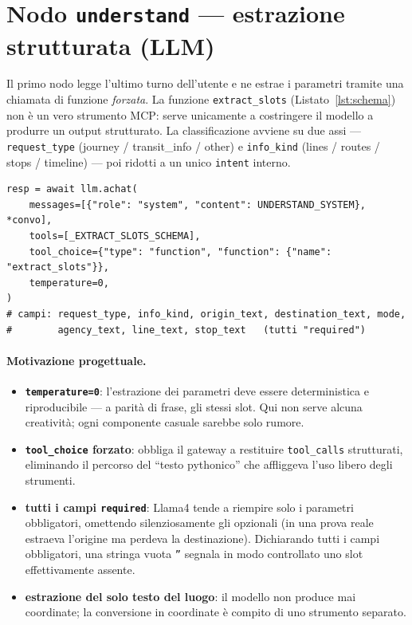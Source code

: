 \documentclass[11pt,a4paper]{article}
\begin{document}
\section{Nodo \texttt{understand} --- estrazione strutturata (LLM)}
Il primo nodo legge l'ultimo turno dell'utente e ne estrae i parametri tramite
una chiamata di funzione \emph{forzata}. La funzione \texttt{extract\_slots}
(Listato~\ref{lst:schema}) non è un vero strumento MCP: serve unicamente a
costringere il modello a produrre un output strutturato. La classificazione
avviene su due assi --- \texttt{request\_type} (journey / transit\_info / other)
e \texttt{info\_kind} (lines / routes / stops / timeline) --- poi ridotti a un
unico \texttt{intent} interno.

\begin{lstlisting}[caption={Lo schema (sintetico) della funzione che forza
l'output strutturato.}, label={lst:schema}]
resp = await llm.achat(
    messages=[{"role": "system", "content": UNDERSTAND_SYSTEM}, *convo],
    tools=[_EXTRACT_SLOTS_SCHEMA],
    tool_choice={"type": "function", "function": {"name": "extract_slots"}},
    temperature=0,
)
# campi: request_type, info_kind, origin_text, destination_text, mode,
#        agency_text, line_text, stop_text   (tutti "required")
\end{lstlisting}

\paragraph{Motivazione progettuale.}
\begin{itemize}
  \item \textbf{\texttt{temperature=0}}: l'estrazione dei parametri deve essere
  deterministica e riproducibile --- a parità di frase, gli stessi slot. Qui non
  serve alcuna creatività; ogni componente casuale sarebbe solo rumore.
  \item \textbf{\texttt{tool\_choice} forzato}: obbliga il gateway a restituire
  \texttt{tool\_calls} strutturati, eliminando il percorso del ``testo
  pythonico'' che affliggeva l'uso libero degli strumenti.
  \item \textbf{tutti i campi \texttt{required}}: Llama4 tende a riempire solo i
  parametri obbligatori, omettendo silenziosamente gli opzionali (in una prova
  reale estraeva l'origine ma perdeva la destinazione). Dichiarando tutti i
  campi obbligatori, una stringa vuota \texttt{''} segnala in modo controllato
  uno slot effettivamente assente.
  \item \textbf{estrazione del solo testo del luogo}: il modello non produce mai
  coordinate; la conversione in coordinate è compito di uno strumento separato.
\end{itemize}
\end{document}
